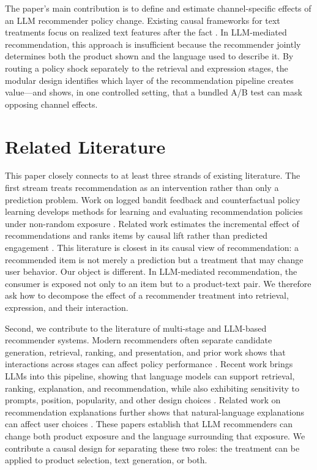 \documentclass[11pt]{article}
\begin{document}
The paper's main contribution is to define and estimate channel-specific effects of an LLM recommender policy change. Existing causal frameworks for text treatments focus on realized text features after the fact \citep{egami2019causal, feldman2026latent}. In LLM-mediated recommendation, this approach is insufficient because the recommender jointly determines both the product shown and the language used to describe it. By routing a policy shock separately to the retrieval and expression stages, the modular design identifies which layer of the recommendation pipeline creates value---and shows, in one controlled setting, that a bundled A/B test can mask opposing channel effects.

\section{Related Literature}\label{section:lit}

This paper closely connects to at least three strands of existing literature. The first stream treats recommendation as an intervention rather than only a prediction problem. Work on logged bandit feedback and counterfactual policy learning develops methods for learning and evaluating recommendation policies under non-random exposure \citep{swaminathan2015counterfactual,schnabel2016recommendations}. Related work estimates the incremental effect of recommendations and ranks items by causal lift rather than predicted engagement \citep{sharma2015estimating,sato2020unbiased,sato2021online}. This literature is closest in its causal view of recommendation: a recommended item is not merely a prediction but a treatment that may change user behavior. Our object is different. In LLM-mediated recommendation, the consumer is exposed not only to an item but to a product-text pair. We therefore ask how to decompose the effect of a recommender treatment into retrieval, expression, and their interaction.

Second, we contribute to the literature of multi-stage and LLM-based recommender systems. Modern recommenders often separate candidate generation, retrieval, ranking, and presentation, and prior work shows that interactions across stages can affect policy performance \citep{ma2020off,hron2021component}. Recent work brings LLMs into this pipeline, showing that language models can support retrieval, ranking, explanation, and recommendation, while also exhibiting sensitivity to prompts, position, popularity, and other design choices \citep{hou2024bridging,hou2024large,lichtenberg2024llm,deldjoo2024understanding,ma2024xrec}. Related work on recommendation explanations further shows that natural-language explanations can affect user choices \citep{rahman2025persuasive}. These papers establish that LLM recommenders can change both product exposure and the language surrounding that exposure. We contribute a causal design for separating these two roles: the treatment can be applied to product selection, text generation, or both.
\end{document}
